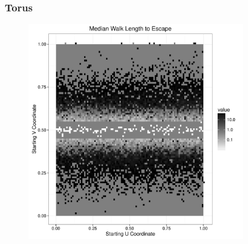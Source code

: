 \documentclass{beamer}
\begin{document}
\begin{frame}[noframenumbering]
	
	\frametitle{Torus}
	
	\begin{figure}
		\includegraphics[width=0.85\textwidth]{images/TorusVBand.pdf}
	\end{figure}
	
\end{frame}
\end{document}
